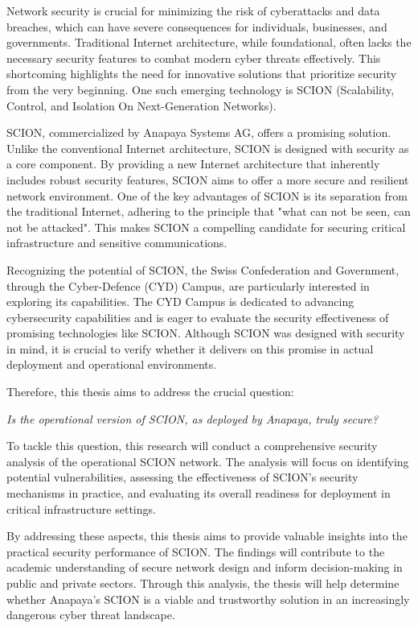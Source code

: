Network security is crucial for minimizing the risk of cyberattacks and data breaches, which can have severe consequences for individuals, businesses, and governments.
Traditional Internet architecture, while foundational, often lacks the necessary security features to combat modern cyber threats effectively.
This shortcoming highlights the need for innovative solutions that prioritize security from the very beginning.
One such emerging technology is SCION (Scalability, Control, and Isolation On Next-Generation Networks).

SCION, commercialized by Anapaya Systems AG, offers a promising solution.
Unlike the conventional Internet architecture, SCION is designed with security as a core component.
By providing a new Internet architecture that inherently includes robust security features, SCION aims to offer a more secure and resilient network environment.
One of the key advantages of SCION is its separation from the traditional Internet, adhering to the principle that "what can not be seen, can not be attacked".
This makes SCION a compelling candidate for securing critical infrastructure and sensitive communications.

Recognizing the potential of SCION, the Swiss Confederation and Government, through the Cyber-Defence (CYD) Campus, are particularly interested in exploring its capabilities.
The CYD Campus is dedicated to advancing cybersecurity capabilities and is eager to evaluate the security effectiveness of promising technologies like SCION.
Although SCION was designed with security in mind, it is crucial to verify whether it delivers on this promise in actual deployment and operational environments.

Therefore, this thesis aims to address the crucial question:
\begin{center}
    \textit{Is the operational version of SCION, as deployed by Anapaya, truly secure?}
\end{center}

To tackle this question, this research will conduct a comprehensive security analysis of the operational SCION network.
The analysis will focus on identifying potential vulnerabilities, assessing the effectiveness of SCION's security mechanisms in practice, and evaluating its overall readiness for deployment in critical infrastructure settings.

By addressing these aspects, this thesis aims to provide valuable insights into the practical security performance of SCION.
The findings will contribute to the academic understanding of secure network design and inform decision-making in public and private sectors.
Through this analysis, the thesis will help determine whether Anapaya's SCION is a viable and trustworthy solution in an increasingly dangerous cyber threat landscape.


